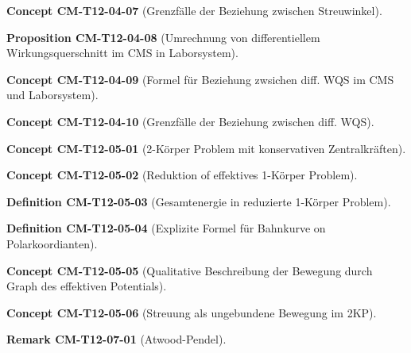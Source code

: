 \documentclass[10pt, letterpaper]{article}
\newcommand{\CustomHeading}[3]{%
  \par\medskip\noindent%
  \textbf{#1 #2} \textnormal{(#3)}.\enskip%
}
\newenvironment{DEF}[2]{\CustomHeading{Definition}{#1}{#2}}{}
\newenvironment{PROP}[2]{\CustomHeading{Proposition}{#1}{#2}}{}
\newenvironment{REM}[2]{\CustomHeading{Remark}{#1}{#2}}{}
\newenvironment{CONC}[2]{\CustomHeading{Concept}{#1}{#2}}{}
\begin{document}
\begin{CONC}{CM-T12-04-07}{Grenzfälle der Beziehung zwischen Streuwinkel}
\end{CONC}

\begin{PROP}{CM-T12-04-08}{Umrechnung von differentiellem Wirkungsquerschnitt im CMS in Laborsystem}
\end{PROP}

\begin{CONC}{CM-T12-04-09}{Formel für Beziehung zwsichen diff. WQS im CMS und Laborsystem}
\end{CONC}

\begin{CONC}{CM-T12-04-10}{Grenzfälle der Beziehung zwischen diff. WQS}
\end{CONC}

\begin{CONC}{CM-T12-05-01}{2-Körper Problem mit konservativen Zentralkräften}
\end{CONC}

\begin{CONC}{CM-T12-05-02}{Reduktion of effektives 1-Körper Problem}
\end{CONC}

\begin{DEF}{CM-T12-05-03}{Gesamtenergie in reduzierte 1-Körper Problem}
\end{DEF}

\begin{DEF}{CM-T12-05-04}{Explizite Formel für Bahnkurve on Polarkoordianten}
\end{DEF}

\begin{CONC}{CM-T12-05-05}{Qualitative Beschreibung der Bewegung durch Graph des effektiven Potentials}
\end{CONC}

\begin{CONC}{CM-T12-05-06}{Streuung als ungebundene Bewegung im 2KP}
\end{CONC}

\begin{REM}{CM-T12-07-01}{Atwood-Pendel}
\end{REM}
\end{document}
